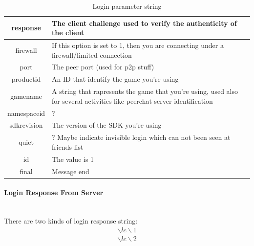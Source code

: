 \documentclass[oneside,titlepage,a4paper]{report} %
\begin{document}
\begin{table}[H]
\begin{tabular}{|c|>{\centering\arraybackslash}p{9cm}|}
		 response   & The client challenge used to verify the authenticity of the client                                                                                                                                        \\ \hline
		 firewall   & If this option is set to 1, then you are connecting under a firewall/limited connection \\
		 \hline
		 port& The peer port (used for p2p stuff)                                                                          \\ \hline
		 productid  & An ID that identify the game you're using                                                                                                                                                                 \\ \hline
		 gamename   & A string that rapresents the game that you're using, used also for several activities like peerchat server identification                                                                                 \\ \hline
		
		namespaceid & ?                                                                                                                                                                                                         \\ \hline
		sdkrevision & The version of the SDK you're using \\ \hline
		   quiet    & ? Maybe indicate invisible login which can not been seen at friends list \\ \hline
		   id& The value is 1\\ \hline
		   final & Message end\\ \hline
	\end{tabular} 
	\caption{Login parameter string}
	\label{Login parameter string}
\end{table}
\paragraph{Login Response From Server}\mbox{}\\
There are two kinds of login response string: 
\begin{equation}\label{Login response string1}
\begin{split}
\backslash lc \backslash 1
\end{split}	
\end{equation}
\begin{equation}\label{Login response string2}
\begin{split}
\backslash lc \backslash 2
\end{split}	
\end{equation}
\end{document}
